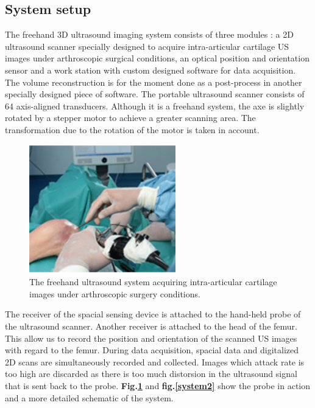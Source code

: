 \documentclass[12pt,journal,compsoc]{IEEEtran}
\begin{document}
\subsection{System setup}

The freehand 3D ultrasound imaging system consists of three modules : a 2D ultrasound scanner specially designed to acquire intra-articular cartilage US images under arthroscopic surgical conditions, an optical position and orientation sensor and a work station with custom designed software for data acquisition. The volume reconstruction is for the moment done as a post-process in another specially designed piece of software.
The portable ultrasound scanner consists of 64 axis-aligned transducers. Although it is a freehand system, the axe is slightly rotated by a stepper motor to achieve a greater scanning area. The transformation due to the rotation of the motor is taken in account.

\begin{figure}[hb!]
\centering
\includegraphics[width=2.5in]{miticao}
\caption{The freehand ultrasound system acquiring intra-articular cartilage images under arthroscopic surgery conditions.}
\label{system1}
\end{figure}


The receiver of the spacial sensing device is attached to the hand-held probe of the ultrasound scanner. Another receiver is attached to the head of the femur. This allow us to record the position and orientation of the scanned US images with regard to the femur. 
During data acquisition, spacial data and digitalized 2D scans are simultaneously recorded and collected. Images which attack rate is too high are discarded as there is too much distorsion in the ultrasound signal that is sent back to the probe. \textbf{Fig.\ref{system1}} and \textbf{fig.\ref{system2}} show the probe in action and a more detailed schematic of the system.
\end{document}
